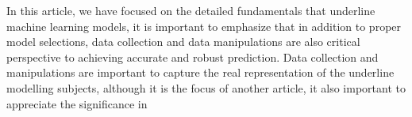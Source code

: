 
\par
In this article, we have focused on the detailed fundamentals that underline machine learning models, it is important to emphasize that in addition to proper model selections, data collection and data manipulations are also critical perspective to achieving accurate and robust prediction. Data collection and manipulations are important to capture the real representation of the underline modelling subjects, although it is the focus of another article, it also important to appreciate the significance in 
\par 
